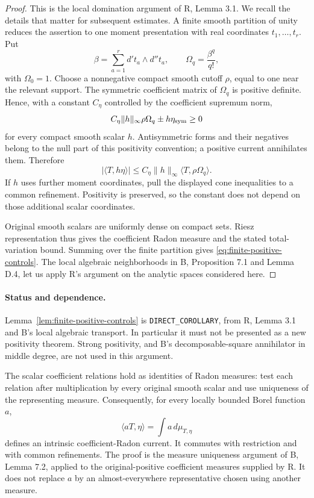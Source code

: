 \documentclass[11pt,a4paper]{article}
\numberwithin{equation}{section}
\theoremstyle{definition}
\theoremstyle{remark}
\begin{document}
\begin{proof}
This is the local domination argument of R, Lemma 3.1. We recall the
details that matter for subsequent estimates. A finite smooth partition
of unity reduces the assertion to one moment presentation with real
coordinates $t_1,\ldots,t_r$. Put
\[
 \beta=\sum_{a=1}^r d't_a\wedge d''t_a,
 \qquad \Omega_q=\frac{\beta^q}{q!},
\]
with $\Omega_0=1$. Choose a nonnegative compact smooth cutoff $\rho$,
equal to one near the relevant support. The symmetric coefficient
matrix of $\Omega_q$ is positive definite. Hence, with a constant
$C_\eta$ controlled by the coefficient supremum norm,
\[
 C_\eta\|h\|_\infty\rho\Omega_q\pm h\eta_{\rm sym}\geq0
\]
for every compact smooth scalar $h$. Antisymmetric forms and their
negatives belong to the null part of this positivity convention; a
positive current annihilates them. Therefore
\[
 |\langle T,h\eta\rangle|
 \leq C_\eta\|h\|_\infty\langle T,\rho\Omega_q\rangle.
\]
If $h$ uses further moment coordinates, pull the displayed cone
inequalities to a common refinement. Positivity is preserved, so the
constant does not depend on those additional scalar coordinates.

Original smooth scalars are uniformly dense on compact sets. Riesz
representation thus gives the coefficient Radon measure and the stated
total-variation bound. Summing over the finite partition gives
\eqref{eq:finite-positive-controls}. The local algebraic neighborhoods in
B, Proposition 7.1 and Lemma D.4, let us apply R's argument on the
analytic spaces considered here.
\end{proof}

\paragraph{Status and dependence.}
Lemma~\ref{lem:finite-positive-controls} is
\texttt{DIRECT\_COROLLARY}, from R, Lemma 3.1 and B's local algebraic
transport. In particular it must not be presented as a new positivity
theorem. Strong positivity, and B's decomposable-square annihilator in
middle degree, are not used in this argument.

The scalar coefficient relations hold as identities of Radon measures:
test each relation after multiplication by every original smooth scalar
and use uniqueness of the representing measure. Consequently, for every
locally bounded Borel function $a$,
\[
 \langle aT,\eta\rangle=\int a\,d\mu_{T,\eta}
\]
defines an intrinsic coefficient-Radon current. It commutes with
restriction and with common refinements. The proof is the measure
uniqueness argument of B, Lemma 7.2, applied to the original-positive
coefficient measures supplied by R. It does not replace $a$ by an
almost-everywhere representative chosen using another measure.
\end{document}
